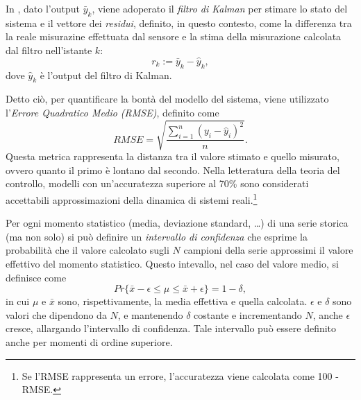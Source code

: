 \documentclass[Lau,binding=0.6cm]{sapthesis}
\begin{document}
In \cite{ahmed2018noise}, dato l'output $\bar{y}_k$, viene adoperato il \textit{filtro di Kalman} per stimare lo stato del sistema e il vettore dei \textit{residui}, definito, in questo contesto, come la differenza tra la reale misurazine effettuata dal sensore
e la stima della misurazione calcolata dal filtro nell'istante $k$:
\begin{equation}
    r_k := \bar{y}_k - \hat{y}_k,
\end{equation}
dove $\hat{y}_k$ \`e l'output del filtro di Kalman.

Detto ci\`o, per quantificare la bont\`a del modello del sistema, viene utilizzato l'\textit{Errore Quadratico Medio (RMSE)}, definito come
\begin{equation}
    RMSE = \sqrt{\frac{\sum_{i=1}^n (y_i - \hat{y}_i)^2}{n}}\label{eq:5}.
\end{equation}
Questa metrica rappresenta la distanza tra il valore stimato e quello misurato, ovvero quanto il primo \`e lontano dal secondo.
Nella letteratura della teoria del controllo, modelli con un'accuratezza superiore al 70\% sono considerati accettabili approssimazioni della dinamica di sistemi reali.\footnote{Se l'RMSE rappresenta un errore, l'accuratezza viene calcolata come 100 - RMSE.}

Per ogni momento statistico (media, deviazione standard, \ldots) di una serie storica (ma non solo) si pu\`o definire un \textit{intervallo di confidenza} 
che esprime la probabilit\`a che il valore calcolato sugli $N$ campioni della serie approssimi il valore effettivo del momento statistico.
Questo intevallo, nel caso del valore medio, si definisce come 
\begin{equation}
    Pr\{\bar{x} - \epsilon \leq \mu \leq \bar{x} + \epsilon\} = 1 - \delta,
    \label{eq:2}
\end{equation}
in cui $\mu$ e $\bar{x}$ sono, rispettivamente, la media effettiva e quella calcolata. $\epsilon$ e $\delta$ sono valori che dipendono da $N$, e mantenendo $\delta$ costante
e incrementando $N$, anche $\epsilon$ cresce, allargando l'intervallo di confidenza.
Tale intervallo pu\`o essere definito anche per momenti di ordine superiore.
\end{document}
